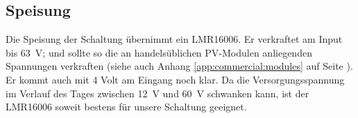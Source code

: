 {\begin{a3pages}
{\begin{minipage}{135mm}
{\begin{minipage}{0.475\textwidth}
        \end{minipage}}
    \end{minipage}}
    \hspace*{15mm}
\end{a3pages}}


\subsection{Speisung}
\label{subsec:hw:sensor:supply}

Die  Speisung  der  Schaltung   \"ubernimmt  ein  LMR16006. Er  verkraftet  am
Input   bis   \SI{63}{\volt};  und   sollte   so   die  an   handels\"ublichen
PV-Modulen    anliegenden   Spannungen    verkraften   (siehe    auch   Anhang
\ref{app:commercial:modules} auf  Seite \pageref{app:commercial:modules}).  Er
kommt auch  mit 4  Volt am  Eingang noch  klar. Da die  Versorgungsspannung im
Verlauf des  Tages zwischen \SI{12}{\volt} und  \SI{60}{\volt} schwanken kann,
ist der LMR16006 soweit bestens f\"ur unsere Schaltung geeignet.

